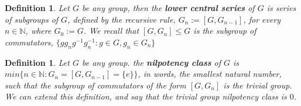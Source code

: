 \documentclass[12pt]{article}
\newtheorem{definition}[theorem]{Definition}
\begin{document}
\begin{definition}
\label{def.lower.central.series}
Let $G$ be any group, then the \textbf{lower central series} of $G$ is series of subgroups of $G$, defined by the recursive rule, $G_n:=[G,G_{n-1}]$, for every $n\in\mathbb{N}$, where $G_0:=G$.  We recall that $[G,G_n]\leq G$ is the subgroup of commutators, $\{gg_ng^{-1}g_n^{-1} : g\in G,g_n\in G_n\}$
\end{definition}
\begin{definition}
\label{def.nilpotency.class}
Let $G$ be any group. the \textbf{nilpotency class} of $G$ is $min\{n\in\mathbb{N} : G_n=[G,G_{n-1}]=\{e\}\}$, in words, the smallest natural number, such that the subgroup of commutators of the form $[G,G_n]$ is the trivial group. We can extend this definition, and say that the trivial group nilpotency class is $0$.
\end{definition}
\end{document}

